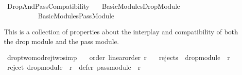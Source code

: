 %
\begin{isabellebody}%
%
%
\isadelimdocument
\isanewline
%
\endisadelimdocument
%
\isatagdocument
\isanewline
\isanewline
%
\isamarkuptrue%
%
\isamarkuptrue%
%
\endisatagdocument
{\isafolddocument}%
%
\isadelimdocument
%
\endisadelimdocument
%
\isadelimtheory
%
\endisadelimtheory
%
\isatagtheory
{}\isamarkupfalse%
\ Drop{\isacharunderscore}{\kern0pt}And{\isacharunderscore}{\kern0pt}Pass{\isacharunderscore}{\kern0pt}Compatibility\isanewline
\ \ \ {\isachardoublequoteopen}Basic{\isacharunderscore}{\kern0pt}Modules{\isacharslash}{\kern0pt}Drop{\isacharunderscore}{\kern0pt}Module{\isachardoublequoteclose}\isanewline
\ \ \ \ \ \ \ \ \ \ {\isachardoublequoteopen}Basic{\isacharunderscore}{\kern0pt}Modules{\isacharslash}{\kern0pt}Pass{\isacharunderscore}{\kern0pt}Module{\isachardoublequoteclose}\isanewline
{}%
\endisatagtheory
{\isafoldtheory}%
%
\isadelimtheory
%
\endisadelimtheory
%
\begin{isamarkuptext}%
This is a collection of properties about the interplay and compatibility
of both the drop module and the pass module.%
\end{isamarkuptext}\isamarkuptrue%
%
\isadelimdocument
%
\endisadelimdocument
%
\isatagdocument
%
\isamarkuptrue%
%
\endisatagdocument
{\isafolddocument}%
%
\isadelimdocument
%
\endisadelimdocument
{}\isamarkupfalse%
\ drop{\isacharunderscore}{\kern0pt}two{\isacharunderscore}{\kern0pt}mod{\isacharunderscore}{\kern0pt}rej{\isacharunderscore}{\kern0pt}two{\isacharbrackleft}{\kern0pt}simp{\isacharbrackright}{\kern0pt}{\isacharcolon}{\kern0pt}\isanewline
\ \ \ order{\isacharcolon}{\kern0pt}\ {\isachardoublequoteopen}linear{\isacharunderscore}{\kern0pt}order\ r{\isachardoublequoteclose}\isanewline
\ \ \ {\isachardoublequoteopen}rejects\ {}\ {\isacharparenleft}{\kern0pt}drop{\isacharunderscore}{\kern0pt}module\ {}\ r{\isacharparenright}{\kern0pt}{\isachardoublequoteclose}\isanewline
%
\isadelimproof
%
\endisadelimproof
%
\isatagproof
{}\isamarkupfalse%
\ {\isacharminus}{\kern0pt}\isanewline
\ \ \isamarkupfalse%
\ {\isachardoublequoteopen}reject\ {\isacharparenleft}{\kern0pt}drop{\isacharunderscore}{\kern0pt}module\ {}\ r{\isacharparenright}{\kern0pt}\ {\isacharequal}{\kern0pt}\ defer\ {\isacharparenleft}{\kern0pt}pass{\isacharunderscore}{\kern0pt}module\ {}\ r{\isacharparenright}{\kern0pt}{\isachardoublequoteclose}\isanewline

\end{isabellebody}
